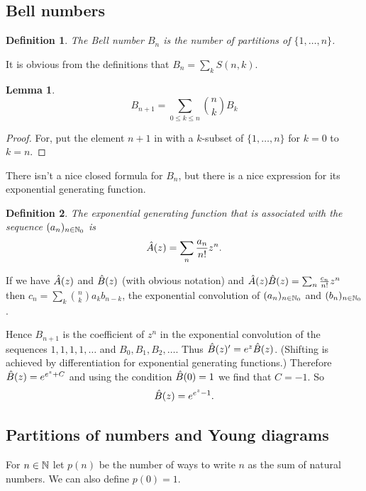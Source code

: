 \documentclass{notes}
\theoremstyle{plain}
\newtheorem*{definition}{Definition}
\newtheorem{lemma}{Lemma}[chapter]
\begin{document}
\subsection{Bell numbers}

\begin{definition}
The Bell number $B_n$ is the number of partitions of
$\{ 1,\dots, n \}$.
\end{definition}

It is obvious from the definitions that $B_n = \sum_k S(n,k)$.

\begin{lemma}
\[
B_{n+1} = \sum_{0 \le k \le n} \binom{n}{k} B_k
\]
\end{lemma}

\begin{proof}
For, put the element $n+1$ in with a $k$-subset of $\{1, \dots, n \}$ for
$k = 0$ to $k = n$.
\end{proof}

There isn't a nice closed formula for $B_n$, but there is a nice expression
for its exponential generating function.

\begin{definition}
The exponential generating function that is associated with the sequence
$(a_n)_{n \in \mathbb{N}_0}$ is
\[
\Hat{A}(z) = \sum_n \frac{a_n}{n!} z^n.
\]
\end{definition}

If we have $\Hat{A}(z)$ and $\Hat{B}(z)$ (with obvious notation) and
$\Hat{A}(z) \Hat{B}(z) = \sum_n \frac{c_n}{n!} z^n$ then
$c_n = \sum_k \binom{n}{k} a_k b_{n-k}$, the exponential convolution
of $(a_n)_{n \in \mathbb{N}_0}$ and $(b_n)_{n \in \mathbb{N}_0}$.

Hence $B_{n+1}$ is the coefficient of $z^n$ in the exponential
convolution of the sequences $1,1,1,1,\dots$ and $B_0, B_1, B_2, \dots$.
Thus $\Hat{B}(z)' = e^z \Hat{B}(z)$.  (Shifting is achieved by
differentiation for exponential generating functions.)  Therefore
$\Hat{B}(z) = e^{e^z + C}$ and using the condition $\Hat{B}(0) = 1$ we find
that $C = -1$.  So
\[
\Hat{B}(z) = e^{e^z - 1}.
\]

\subsection{Partitions of numbers and Young diagrams}

For $n \in \mathbb{N}$ let $p(n)$ be the number of ways to write $n$ as the
sum of natural numbers.  We can also define $p(0) = 1$.
\end{document}
